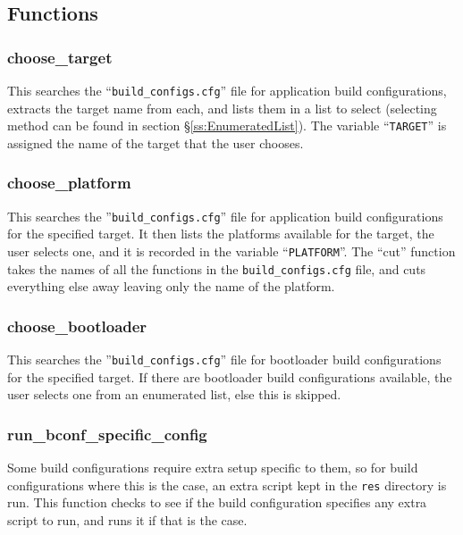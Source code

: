 \documentclass[a4paper, oneside, 11pt, titlepage, onecolumn, openright]{report}
\begin{document}
\subsection{Functions}
			\label{ss:crecompFunctions}
			
\subsubsection{choose\_target}
			\label{sss:crecompChooseTarget}
			This searches the ``\texttt{build\_configs.cfg}'' file for application build configurations, extracts the target name from each, and lists them in a list to select (selecting method can be found in section \S\ref{ss:EnumeratedList}). 
			The variable ``\texttt{TARGET}'' is assigned the name of the target that the user chooses.
			
\subsubsection{choose\_platform}
			\label{sss:crecompChoosePlatform}
			This searches the ''\texttt{build\_configs.cfg}'' file for application build configurations	for the specified target. It then lists the platforms available for the target, the user selects one, and it is recorded in the variable ``\texttt{PLATFORM}''. The ``cut'' function takes the names of all the functions in the \texttt{build\_configs.cfg} file, and cuts everything else away leaving only the name of the platform.
			
\subsubsection{choose\_bootloader}
			\label{sss:crecompChooseBootloader}
			This searches the ''\texttt{build\_configs.cfg}'' file for bootloader build configurations for the specified target. If there are bootloader build configurations available, the user selects one from an enumerated list, else this is skipped.
			
\subsubsection{run\_bconf\_specific\_config}
			\label{sss:crecompRunBconfSpecificConfig}
			Some build configurations require extra setup specific to them, so for build configurations where this is the case, an extra script kept in the \texttt{res} directory is run. 
			This function checks to see if the build configuration specifies any extra script to run, and runs it if that is the case.
			
\end{document}
